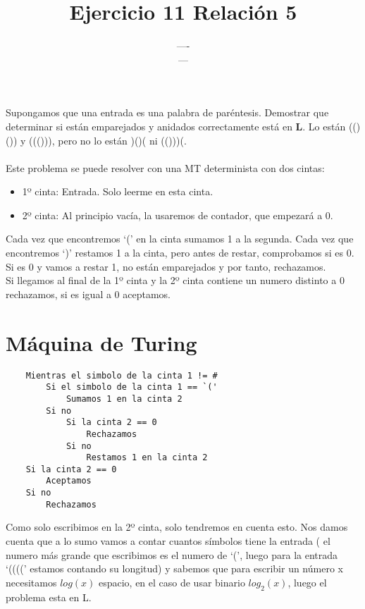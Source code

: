 \documentclass{article}
\title{Ejercicio 11 Relación 5}
\author{---- \\ ---}
\date{}
\begin{document}
\maketitle

Supongamos que una entrada es una palabra de paréntesis. Demostrar que determinar si
están emparejados y anidados correctamente está en \textbf{L}. Lo están (()()) y ((())), pero no
lo están )()( ni (()))(.\\
\\
Este problema se puede resolver con una MT determinista con dos cintas:
\begin{itemize}
    \item 1º cinta: Entrada. Solo leerme en esta cinta.
    \item 2º cinta: Al principio vacía, la usaremos de contador, que empezará a 0.
\end{itemize}

Cada vez que encontremos `(' en la cinta sumamos 1 a la segunda. Cada vez que encontremos `)' restamos 1 a la cinta, pero antes de restar, comprobamos si es 0. Si es 0 y vamos a restar 1, no están emparejados y por tanto, rechazamos.\\
Si llegamos al final de la 1º cinta y la 2º cinta contiene un numero distinto a 0 rechazamos, si es igual a 0 aceptamos.

\section{Máquina de Turing}
\begin{lstlisting}
    Mientras el simbolo de la cinta 1 != #
        Si el simbolo de la cinta 1 == `('
            Sumamos 1 en la cinta 2
        Si no
            Si la cinta 2 == 0
                Rechazamos
            Si no
                Restamos 1 en la cinta 2
    Si la cinta 2 == 0
        Aceptamos
    Si no
        Rechazamos
\end{lstlisting}

Como solo escribimos en la 2º cinta, solo tendremos en cuenta esto. Nos damos cuenta que a lo sumo vamos a contar cuantos símbolos tiene la entrada ( el numero más grande que escribimos es el numero de `(', luego para la entrada `((((' estamos contando su longitud) y sabemos que para escribir un número x necesitamos $log(x)$ espacio, en el caso de usar binario $log_{2}(x)$, luego el problema esta en L.
\end{document}
